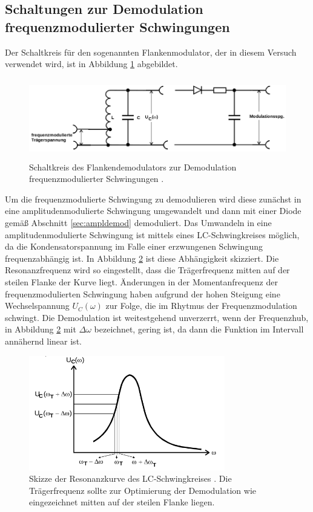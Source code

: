 \subsection{Schaltungen zur Demodulation frequenzmodulierter Schwingungen}

Der Schaltkreis für den sogenannten Flankenmodulator, der in diesem Versuch verwendet wird,
ist in Abbildung \ref{fig:flankendemodulator} abgebildet.

\begin{figure}
  \centering
  \includegraphics[height=3.5cm]{JasperErsterSchultag/flankendemodulator.png}
  \caption{Schaltkreis des Flankendemodulators zur Demodulation frequenzmodulierter Schwingungen \cite{anleitung}.}
  \label{fig:flankendemodulator}
\end{figure}

Um die frequenzmodulierte Schwingung zu demodulieren
wird diese zunächst in eine amplitudenmodulierte Schwingung umgewandelt und dann mit einer Diode gemäß Abschnitt \ref{sec:ampldemod}
demoduliert. Das Umwandeln in eine amplitudenmodulierte Schwingung ist mittels eines LC-Schwingkreises möglich,
da die Kondensatorspannung im Falle einer erzwungenen Schwingung frequenzabhängig ist. In Abbildung
\ref{fig:freqabh} ist diese Abhängigkeit skizziert. Die Resonanzfrequenz wird so eingestellt, dass die Trägerfrequenz
mitten auf der steilen Flanke der Kurve liegt. Änderungen in der Momentanfrequenz der frequenzmodulierten Schwingung
haben aufgrund der hohen Steigung eine Wechselspannung $U_C(\omega)$ zur Folge, die im Rhytmus der Frequenzmodulation
schwingt. Die Demodulation ist weitestgehend unverzerrt, wenn der Frequenzhub, in Abbildung \ref{fig:freqabh} mit
$\Delta \omega$ bezeichnet, gering ist, da dann die Funktion im Intervall annähernd linear ist.

\begin{figure}
  \centering
  \includegraphics[height=5cm]{JasperErsterSchultag/freqabh.png}
  \caption{Skizze der Resonanzkurve des LC-Schwingkreises \cite{anleitung}. Die Trägerfrequenz sollte zur Optimierung der Demodulation
  wie eingezeichnet mitten auf der steilen Flanke liegen.}
  \label{fig:freqabh}
\end{figure}

